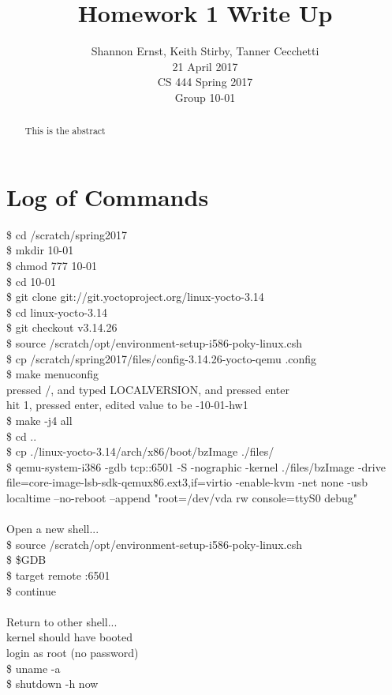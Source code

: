 \documentclass[letterpaper,10pt,serif,draftclsnofoot,onecolumn,compsoc,titlepage]{article}%
\title{Homework 1 Write Up}
\author{Shannon Ernst, Keith Stirby, Tanner Cecchetti \\ 21 April 2017 \\ CS 444 Spring 2017 \\ Group 10-01}
\begin{document}
\maketitle
\begin{abstract}
This is the abstract
\end{abstract}
\newpage
\section{Log of Commands}
\$ cd /scratch/spring2017 \\
\$ mkdir 10-01 \\
\$ chmod 777 10-01 \\
\$ cd 10-01 \\
\$ git clone git://git.yoctoproject.org/linux-yocto-3.14 \\
\$ cd linux-yocto-3.14 \\
\$ git checkout v3.14.26 \\
\$ source /scratch/opt/environment-setup-i586-poky-linux.csh \\
\$ cp /scratch/spring2017/files/config-3.14.26-yocto-qemu .config \\
\$ make menuconfig \\
pressed /, and typed LOCALVERSION, and pressed enter \\
hit 1, pressed enter, edited value to be -10-01-hw1 \\
\$ make -j4 all \\
\$ cd .. \\
\$ cp ./linux-yocto-3.14/arch/x86/boot/bzImage ./files/ \\
\$ qemu-system-i386 -gdb tcp::6501 -S -nographic -kernel ./files/bzImage -drive
file=core-image-lsb-sdk-qemux86.ext3,if=virtio -enable-kvm -net none -usb
localtime --no-reboot --append "root=/dev/vda rw console=ttyS0 debug" \\
\\ Open a new shell... \\
\$ source /scratch/opt/environment-setup-i586-poky-linux.csh \\
\$ \$GDB \\
\$ target remote :6501 \\
\$ continue \\
\\ Return to other shell... \\
kernel should have booted \\
login as root (no password) \\
\$ uname -a \\
\$ shutdown -h now
\end{document}
